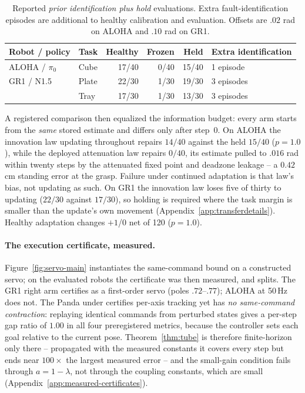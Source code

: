 \begin{table}[H]
\centering\small
\setlength{\tabcolsep}{4pt}
\caption{Reported \emph{prior identification plus hold} evaluations. Extra fault-identification episodes are additional to healthy calibration and evaluation. Offsets are $.02$ rad on ALOHA and $.10$ rad on GR1.}
\label{tab:transfer}
\begin{tabular}{llrrrl}
\toprule
Robot / policy & Task & Healthy & Frozen & Held & Extra identification\\
\midrule
ALOHA / $\pi_0$ & Cube & 17/40 & 0/40 & 15/40 & 1 episode\\
GR1 / N1.5 & Plate & 22/30 & 1/30 & 19/30 & 3 episodes\\
 & Tray & 17/30 & 1/30 & 13/30 & 3 episodes\\
\bottomrule
\end{tabular}
\end{table}
A registered comparison then equalized the information budget: every arm
starts from the \emph{same} stored estimate and differs only after step~0.
On ALOHA the innovation law updating throughout repairs $14/40$ against the
held $15/40$ ($p=1.0$), while the deployed attenuation law repairs $0/40$,
its estimate pulled to $.016$ rad within twenty steps by the attenuated fixed
point and deadzone leakage -- a $0.42$ cm standing error at the grasp. Failure
under continued adaptation is that law's bias, not updating as such. On GR1
the innovation law loses five of thirty to updating ($22/30$ against
$17/30$), so holding is required where the task margin is smaller than the
update's own movement (Appendix~\ref{app:transferdetails}). Healthy
adaptation changes $+1$/$0$ net of 120 ($p=1.0$).

\paragraph{The execution certificate, measured.}
Figure~\ref{fig:servo-main} instantiates the same-command bound on a
constructed servo; on the evaluated robots the certificate was then measured,
and splits. The GR1 right arm certifies as a first-order servo (poles
$.72$--$.77$); ALOHA at 50\,Hz does not. The Panda under 
certifies per-axis tracking yet has \emph{no same-command contraction}:
replaying identical commands from perturbed states gives a per-step gap ratio
of $1.00$ in all four preregistered metrics, because the controller sets each
goal relative to the current pose. Theorem~\ref{thm:tube} is therefore
finite-horizon only there -- propagated with the measured constants it covers
every step but ends near $100\times$ the largest measured error -- and the
small-gain condition fails through $a=1-\lambda$, not through the coupling
constants, which are small (Appendix~\ref{app:measured-certificates}).

